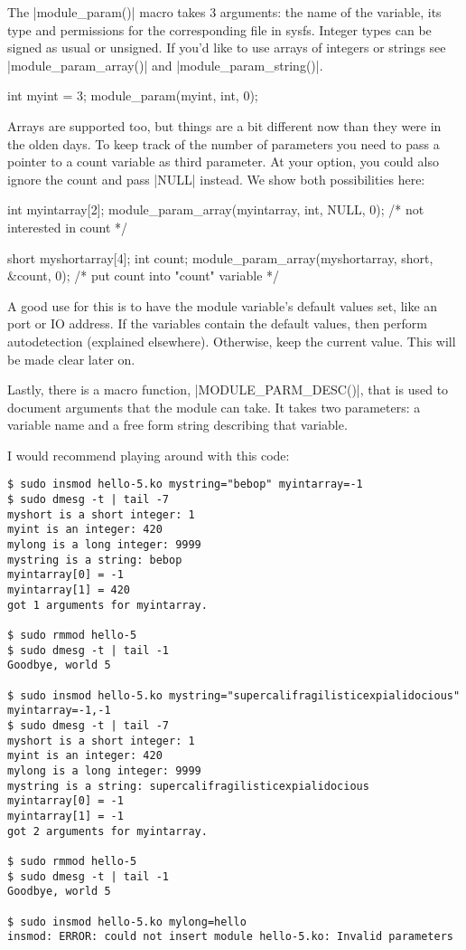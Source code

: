 \documentclass[10pt, oneside]{book}
\begin{document}
The \cpp|module_param()| macro takes 3 arguments: the name of the variable, its type and permissions for the corresponding file in sysfs.
Integer types can be signed as usual or unsigned. If you'd like to use arrays of integers or strings see \cpp|module_param_array()| and \cpp|module_param_string()|.

\begin{code}
int myint = 3;
module_param(myint, int, 0);
\end{code}

Arrays are supported too, but things are a bit different now than they were in the olden days.
To keep track of the number of parameters you need to pass a pointer to a count variable as third parameter. 
At your option, you could also ignore the count and pass \cpp|NULL| instead. We show both possibilities here:

\begin{code}
int myintarray[2];
module_param_array(myintarray, int, NULL, 0); /* not interested in count */

short myshortarray[4];
int count;
module_param_array(myshortarray, short, &count, 0); /* put count into "count" variable */
\end{code}

A good use for this is to have the module variable's default values set, like an port or IO address.
If the variables contain the default values, then perform autodetection (explained elsewhere). Otherwise, keep the current value.
This will be made clear later on.

Lastly, there is a macro function, \cpp|MODULE_PARM_DESC()|, that is used to document arguments that the module can take.
It takes two parameters: a variable name and a free form string describing that variable.


I would recommend playing around with this code:
\begin{verbatim}
$ sudo insmod hello-5.ko mystring="bebop" myintarray=-1
$ sudo dmesg -t | tail -7
myshort is a short integer: 1
myint is an integer: 420
mylong is a long integer: 9999
mystring is a string: bebop
myintarray[0] = -1
myintarray[1] = 420
got 1 arguments for myintarray.

$ sudo rmmod hello-5
$ sudo dmesg -t | tail -1
Goodbye, world 5

$ sudo insmod hello-5.ko mystring="supercalifragilisticexpialidocious" myintarray=-1,-1
$ sudo dmesg -t | tail -7
myshort is a short integer: 1
myint is an integer: 420
mylong is a long integer: 9999
mystring is a string: supercalifragilisticexpialidocious
myintarray[0] = -1
myintarray[1] = -1
got 2 arguments for myintarray.

$ sudo rmmod hello-5
$ sudo dmesg -t | tail -1
Goodbye, world 5

$ sudo insmod hello-5.ko mylong=hello
insmod: ERROR: could not insert module hello-5.ko: Invalid parameters
\end{verbatim}
\end{document}
